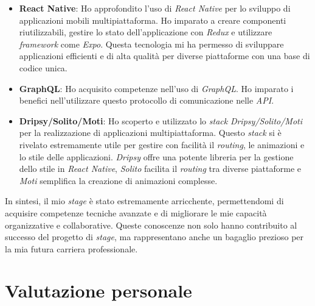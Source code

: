 \begin{itemize}
    \item \textbf{React Native}: Ho approfondito l'uso di \textit{React Native} per lo sviluppo di applicazioni mobili multipiattaforma.
    Ho imparato a creare componenti riutilizzabili, gestire lo stato dell'applicazione con \textit{Redux} e utilizzare \textit{framework} come \textit{Expo}.
    Questa tecnologia mi ha permesso di sviluppare applicazioni efficienti e di alta qualità per diverse piattaforme con una base di codice unica.
    \item \textbf{GraphQL}: Ho acquisito competenze nell'uso di \textit{GraphQL}. Ho imparato i benefici nell'utilizzare questo protocollo di comunicazione nelle \textit{API}.
    \item \textbf{Dripsy/Solito/Moti}: Ho scoperto e utilizzato lo \textit{stack} \textit{Dripsy/Solito/Moti} per la realizzazione di applicazioni multipiattaforma.
    Questo \textit{stack} si è rivelato estremamente utile per gestire con facilità il \textit{routing}, le animazioni e lo stile delle applicazioni.
    \textit{Dripsy} offre una potente libreria per la gestione dello stile in \textit{React Native}, \textit{Solito} facilita il \textit{routing} tra diverse piattaforme e \textit{Moti} semplifica la creazione di animazioni complesse.
\end{itemize}

In sintesi, il mio \textit{stage} è stato estremamente arricchente, permettendomi di acquisire competenze tecniche avanzate e di migliorare le mie capacità organizzative e collaborative.
Queste conoscenze non solo hanno contribuito al successo del progetto di \textit{stage}, ma rappresentano anche un bagaglio prezioso per la mia futura carriera professionale.


\section{Valutazione personale}


